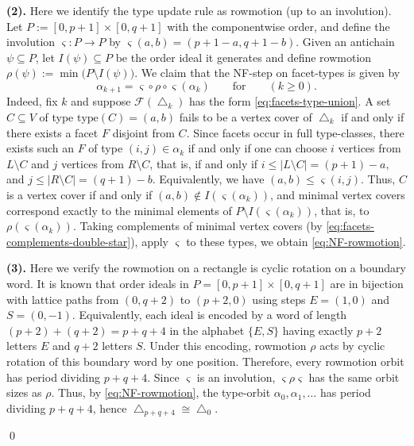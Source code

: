 \documentclass[12pt]{article}
\renewenvironment{proof}{{\noindent\bfseries Proof.}}{\qed}
\theoremstyle{plain}
\theoremstyle{definition}
\newcommand{\F}{\mathcal{F}}
\begin{document}
\begin{proof}
			\smallskip\noindent
			\textbf{(2).} Here we identify the type update rule as rowmotion (up to an involution).	Let \(P:=[0,p+1]\times[0,q+1]\) with the componentwise order, and define the involution $\varsigma:P\to P$ by
			 $\varsigma(a,b)=(p+1-a, q+1-b).$ Given an antichain \(\psi\subseteq P\), let \(I(\psi)\subseteq P\) be the order ideal it generates and define rowmotion $\rho(\psi):=\min\bigl(P\setminus I(\psi)\bigr).$ We claim that the NF-step on facet-types is given by
			\begin{equation}\label{eq:NF-rowmotion}
				\alpha_{k+1}=\varsigma\circ \rho\circ \varsigma(\alpha_k)\qquad\text{for}\qquad (k\ge 0).
			\end{equation}
			Indeed, fix \(k\) and suppose \(\F(\bigtriangleup_k)\) has the form \eqref{eq:facets-type-union}.
			A set \(C\subseteq V\) of type \( \mathrm{type}(C)=(a,b)\) fails to be a vertex cover of \(\bigtriangleup_k\)
			if and only if there exists a facet \(F\) disjoint from \(C\). Since facets occur in full type-classes,
			there exists such an \(F\) of type \((i,j)\in\alpha_k\) if and only if one can choose \(i\) vertices from \(L\setminus C\) and
			\(j\) vertices from \(R\setminus C\), that is, if and only if
			 $i\le |L\setminus C|=(p+1)-a,$ and  $j\le |R\setminus C|=(q+1)-b.$ 
			Equivalently, we have \((a,b)\le \varsigma(i,j)\).
			Thus, \(C\) is a vertex cover if and only if \((a,b)\notin I(\varsigma(\alpha_k))\), and minimal vertex covers correspond exactly to the
			minimal elements of \(P\setminus I(\varsigma(\alpha_k))\), that is, to \(\rho(\varsigma(\alpha_k))\).
			Taking complements of minimal vertex covers (by \eqref{eq:facets-complements-double-star}), 
			apply \(\varsigma\) to these types, we obtain \eqref{eq:NF-rowmotion}.
			
			\smallskip\noindent
			\textbf{(3).} Here we verify the rowmotion on a rectangle is cyclic rotation on a boundary word.	It is known that order ideals in \(P=[0,p+1]\times[0,q+1]\) are in bijection with lattice paths from	\((0,q+2)\) to \((p+2,0)\) using steps \(E=(1,0)\) and \(S=(0,-1)\).	Equivalently, each ideal is encoded by a word of length $(p+2)+(q+2)=p+q+4$ 
			in the alphabet \(\{E,S\}\) having exactly \(p+2\) letters \(E\) and \(q+2\) letters \(S\).
			Under this encoding, rowmotion \(\rho\) acts by cyclic rotation of this boundary word by one position.
			Therefore, every rowmotion orbit has period dividing \(p+q+4\). Since \(\varsigma\) is an involution, \(\varsigma\rho\varsigma\) has the same orbit sizes as \(\rho\).
			Thus, by \eqref{eq:NF-rowmotion}, the type-orbit \(\alpha_0,\alpha_1,\dots\) has period dividing \(p+q+4\),
			hence \(\bigtriangleup_{p+q+4}\cong \bigtriangleup_0\).
			

\end{proof}
\end{document}
